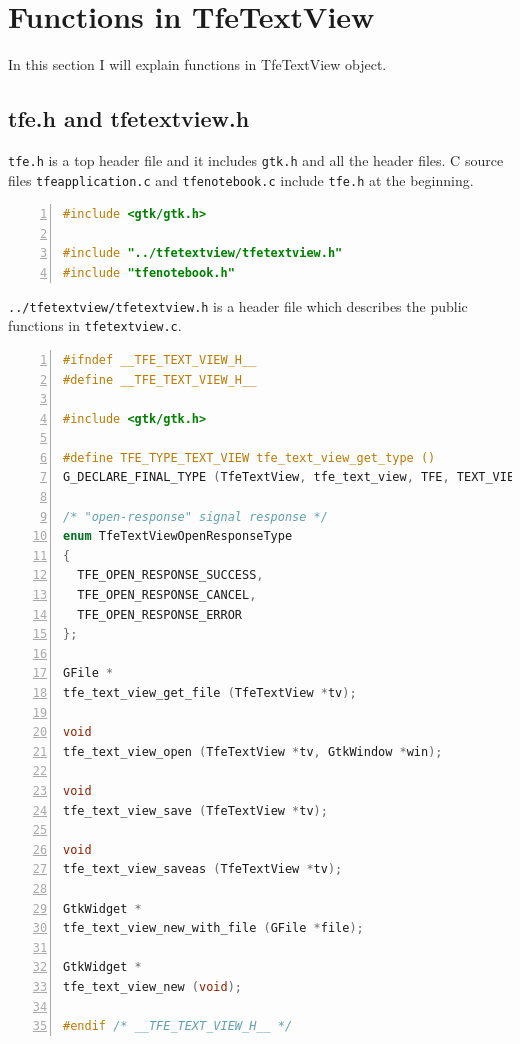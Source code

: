 \hypertarget{functions-in-tfetextview}{%
\section{Functions in TfeTextView}\label{functions-in-tfetextview}}

In this section I will explain functions in TfeTextView object.

\hypertarget{tfe.h-and-tfetextview.h}{%
\subsection{tfe.h and tfetextview.h}\label{tfe.h-and-tfetextview.h}}

\passthrough{\lstinline!tfe.h!} is a top header file and it includes
\passthrough{\lstinline!gtk.h!} and all the header files. C source files
\passthrough{\lstinline!tfeapplication.c!} and
\passthrough{\lstinline!tfenotebook.c!} include
\passthrough{\lstinline!tfe.h!} at the beginning.

\begin{lstlisting}[language=C, numbers=left]
#include <gtk/gtk.h>

#include "../tfetextview/tfetextview.h"
#include "tfenotebook.h"
\end{lstlisting}

\passthrough{\lstinline!../tfetextview/tfetextview.h!} is a header file
which describes the public functions in
\passthrough{\lstinline!tfetextview.c!}.

\begin{lstlisting}[language=C, numbers=left]
#ifndef __TFE_TEXT_VIEW_H__
#define __TFE_TEXT_VIEW_H__

#include <gtk/gtk.h>

#define TFE_TYPE_TEXT_VIEW tfe_text_view_get_type ()
G_DECLARE_FINAL_TYPE (TfeTextView, tfe_text_view, TFE, TEXT_VIEW, GtkTextView)

/* "open-response" signal response */
enum TfeTextViewOpenResponseType
{
  TFE_OPEN_RESPONSE_SUCCESS,
  TFE_OPEN_RESPONSE_CANCEL,
  TFE_OPEN_RESPONSE_ERROR
};

GFile *
tfe_text_view_get_file (TfeTextView *tv);

void
tfe_text_view_open (TfeTextView *tv, GtkWindow *win);

void
tfe_text_view_save (TfeTextView *tv);

void
tfe_text_view_saveas (TfeTextView *tv);

GtkWidget *
tfe_text_view_new_with_file (GFile *file);

GtkWidget *
tfe_text_view_new (void);

#endif /* __TFE_TEXT_VIEW_H__ */
\end{lstlisting}

